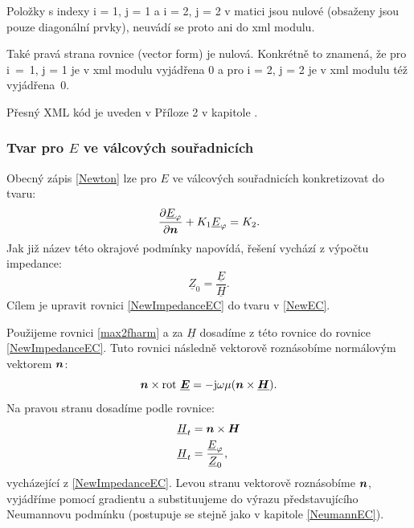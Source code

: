 \documentclass[12pt,a4paper,oneside]{article}
\numberwithin{equation}{section} %
\numberwithin{figure}{section} %
\numberwithin{table}{section} %
\newcommand{\mj}{\mathrm{j}} %
\renewcommand{\vec}[1]{\mbox{\boldmath$#1$}} %
\newcommand{\faz}[1]{{\underline{#1}}} %
\newcommand{\rot}{\mathrm{rot}\ }
\begin{document}
Položky s indexy i = 1, j = 1 a i = 2, j = 2 v matici jsou nulové (obsaženy jsou pouze diagonální prvky), neuvádí se proto ani do xml modulu.

Také pravá strana rovnice (vector form) je nulová. Konkrétně to znamená, že pro i~=~1, j = 1 je v xml modulu vyjádřena $0$ a pro i = 2, j = 2 je v xml modulu též vyjádřena~$0$.

Přesný XML kód je uveden v Příloze 2 v kapitole .



\subsubsection*{Tvar pro \faz{\vec{E}} ve válcových souřadnicích}
Obecný zápis \ref{Newton} lze pro \faz{\vec{E}} ve válcových souřadnicích konkretizovat do tvaru:
\begin{equation}
\label{NewEC}
\frac{\partial \faz{E} _{\varphi}}{\partial \vec{n}} + K_1 \faz{E} _{\varphi} = K_2 .
\end{equation}
Jak již název této okrajové podmínky napovídá, řešení vychází z výpočtu impedance: 
\begin{equation}
\label{NewImpedanceEC}
\faz{Z} _0 = \frac{\faz{E}}{\faz{H}} .
\end{equation}
Cílem je upravit rovnici \ref{NewImpedanceEC} do tvaru v \ref{NewEC}.

Použijeme rovnici \ref{max2fharm} a za $\faz{H}$ dosadíme z této rovnice do rovnice \ref{NewImpedanceEC}. Tuto rovnici následně vektorově roznásobíme normálovým vektorem $\vec{n}$:
\begin{equation}
\vec{n} \times \rot \faz{\vec{E}} = - \mj \omega \mu (\vec{n} \times \faz{\vec{H}}) .
\end{equation}
Na pravou stranu dosadíme podle rovnice:
\begin{subequations}
\begin{align}
\faz{H} _t &= \vec{n} \times \vec{H}
\\
\faz{H} _t &= \frac{\faz{E} _{\varphi}}{\faz{Z} _0} ,
\end{align}
\end{subequations}
vycházející z \ref{NewImpedanceEC}. Levou stranu vektorově roznásobíme $\vec{n}$, vyjádříme pomocí gradientu a substituujeme do výrazu představujícího Neumannovu podmínku (postupuje se stejně jako v kapitole \ref{NeumannEC}).
\end{document}
